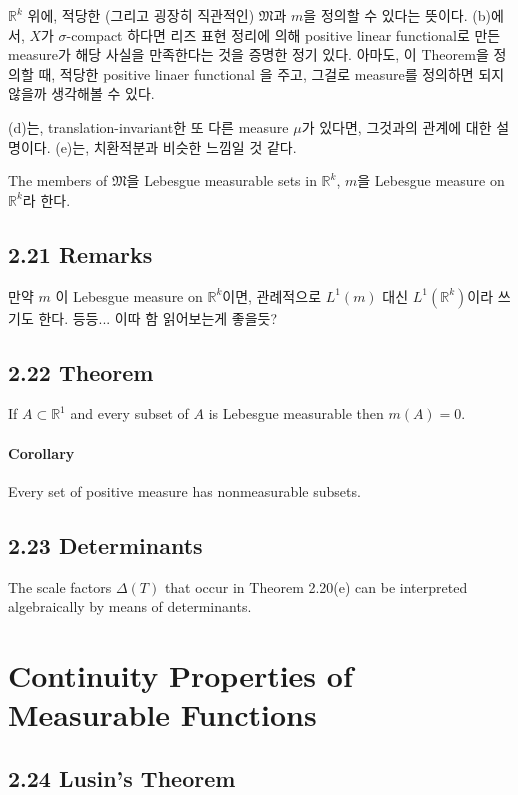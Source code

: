 \documentclass[11pt,reqno]{amsart}
\renewcommand{\(}{\left(}
\renewcommand{\)}{\right)}
\renewcommand{\[}{\left[}
\renewcommand{\]}{\right]}
\newcommand{\R}{\mathbb{R}}
\newcommand{\M}{\mathfrak{M}}
\begin{document}
$\R^k$ 위에, 적당한 (그리고 굉장히 직관적인) $\M$과 $m$을 정의할 수 있다는 뜻이다. (b)에서, $X$가 $\sigma$-compact 하다면 리즈 표현 정리에 의해
positive linear functional로 만든 measure가 해당 사실을 만족한다는 것을 증명한 정기 있다. 아마도, 이 Theorem을 정의할 때, 적당한 positive linaer
functional 을 주고, 그걸로 measure를 정의하면 되지 않을까 생각해볼 수 있다.

(d)는, translation-invariant한 또 다른 measure $\mu$가 있다면, 그것과의 관계에 대한 설명이다.
(e)는, 치환적분과 비슷한 느낌일 것 같다.

The members of $\M$을 Lebesgue measurable sets in $\R^k$, $m$을 Lebesgue measure on $\R^k$라 한다.

\subsection{2.21 Remarks}

만약 $m$ 이 Lebesgue measure on $\R^k$이면, 관례적으로 $L^1 (m)$ 대신 $L^1 (\R^k)$이라 쓰기도 한다. 등등... 이따 함 읽어보는게 좋을듯?

\subsection{2.22 Theorem}

If $A \subset \R^1$ and every subset of $A$ is Lebesgue measurable then $m(A) = 0$.

\paragraph{Corollary}

Every set of positive measure has nonmeasurable subsets.

\subsection{2.23 Determinants}

The scale factors $\Delta(T)$ that occur in Theorem 2.20(e) can be interpreted algebraically by means of determinants.

\section{Continuity Properties of Measurable Functions}

\subsection{2.24 Lusin's Theorem}
\end{document}
